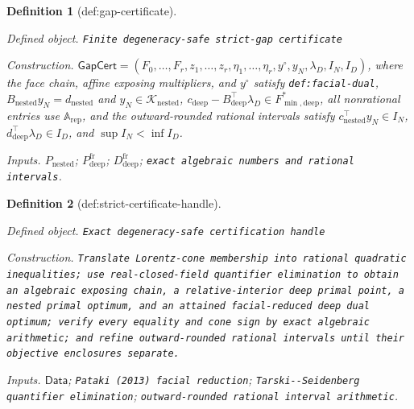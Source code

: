\documentclass{article}
\newtheorem{definition}{Definition}
\begin{document}
\begin{definition}[def:gap-certificate]\label{def:gap-certificate}
\par\smallskip\noindent\emph{Defined object.} \texttt{Finite degeneracy-\allowbreak{}safe strict-\allowbreak{}gap certificate}
\par\smallskip\noindent\emph{Construction.} \(\mathsf{GapCert}=(F_0,\ldots,F_r,z_1,\ldots,z_r,\eta_1,\ldots,\eta_r,y^\circ,y_N,\lambda_D,I_N,I_D)\), where the face chain, affine exposing multipliers, and \(y^\circ\) satisfy \texttt{def:facial-dual}, \(B_{\mathrm{nested}}y_N=d_{\mathrm{nested}}\) and \(y_N\in\mathcal K_{\mathrm{nested}}\), \(c_{\mathrm{deep}}-B_{\mathrm{deep}}^{\top}\lambda_D\in F_{\min,\mathrm{deep}}^*\), all nonrational entries use \(\mathbb A_{\mathrm{rep}}\), and the outward-rounded rational intervals satisfy \(c_{\mathrm{nested}}^{\top}y_N\in I_N\), \(d_{\mathrm{deep}}^{\top}\lambda_D\in I_D\), and \(\sup I_N<\inf I_D\).
\par\smallskip\noindent\emph{Inputs.} \(P_{\mathrm{nested}}\); \(P^{\mathrm{fr}}_{\mathrm{deep}}\); \(D^{\mathrm{fr}}_{\mathrm{deep}}\); \texttt{exact algebraic numbers and rational intervals}.
\end{definition}

\begin{definition}[def:strict-certificate-handle]\label{def:strict-certificate-handle}
\par\smallskip\noindent\emph{Defined object.} \texttt{Exact degeneracy-\allowbreak{}safe certification handle}
\par\smallskip\noindent\emph{Construction.} \texttt{Translate Lorentz-\allowbreak{}cone membership into rational quadratic inequalities;\allowbreak{} use real-\allowbreak{}closed-\allowbreak{}field quantifier elimination to obtain an algebraic exposing chain,\allowbreak{} a relative-\allowbreak{}interior deep primal point,\allowbreak{} a nested primal optimum,\allowbreak{} and an attained facial-\allowbreak{}reduced deep dual optimum;\allowbreak{} verify every equality and cone sign by exact algebraic arithmetic;\allowbreak{} and refine outward-\allowbreak{}rounded rational intervals until their objective enclosures separate.}
\par\smallskip\noindent\emph{Inputs.} \(\mathsf{Data}\); \texttt{Pataki (2013) facial reduction}; \texttt{Tarski-\allowbreak{}-\allowbreak{}Seidenberg quantifier elimination}; \texttt{outward-\allowbreak{}rounded rational interval arithmetic}.
\end{definition}
\end{document}
